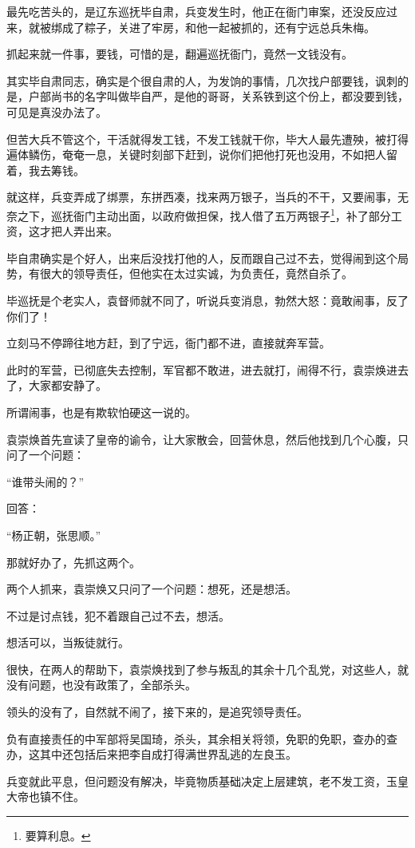 \begin{multicols}{\theparacolNo}
		最先吃苦头的，是辽东巡抚毕自肃，兵变发生时，他正在衙门审案，还没反应过来，就被绑成了粽子，关进了牢房，和他一起被抓的，还有宁远总兵朱梅。

		抓起来就一件事，要钱，可惜的是，翻遍巡抚衙门，竟然一文钱没有。

		其实毕自肃同志，确实是个很自肃的人，为发饷的事情，几次找户部要钱，讽刺的是，户部尚书的名字叫做毕自严，是他的哥哥，关系铁到这个份上，都没要到钱，可见是真没办法了。

		但苦大兵不管这个，干活就得发工钱，不发工钱就干你，毕大人最先遭殃，被打得遍体鳞伤，奄奄一息，关键时刻部下赶到，说你们把他打死也没用，不如把人留着，我去筹钱。

		就这样，兵变弄成了绑票，东拼西凑，找来两万银子，当兵的不干，又要闹事，无奈之下，巡抚衙门主动出面，以政府做担保，找人借了五万两银子\footnote{要算利息。}，补了部分工资，这才把人弄出来。

		毕自肃确实是个好人，出来后没找打他的人，反而跟自己过不去，觉得闹到这个局势，有很大的领导责任，但他实在太过实诚，为负责任，竟然自杀了。

		毕巡抚是个老实人，袁督师就不同了，听说兵变消息，勃然大怒：竟敢闹事，反了你们了！

		立刻马不停蹄往地方赶，到了宁远，衙门都不进，直接就奔军营。

		此时的军营，已彻底失去控制，军官都不敢进，进去就打，闹得不行，袁崇焕进去了，大家都安静了。

		所谓闹事，也是有欺软怕硬这一说的。

		袁崇焕首先宣读了皇帝的谕令，让大家散会，回营休息，然后他找到几个心腹，只问了一个问题：

		“谁带头闹的？”

		回答：

		“杨正朝，张思顺。”

		那就好办了，先抓这两个。

		两个人抓来，袁崇焕又只问了一个问题：想死，还是想活。

		不过是讨点钱，犯不着跟自己过不去，想活。

		想活可以，当叛徒就行。

		很快，在两人的帮助下，袁崇焕找到了参与叛乱的其余十几个乱党，对这些人，就没有问题，也没有政策了，全部杀头。

		领头的没有了，自然就不闹了，接下来的，是追究领导责任。

		负有直接责任的中军部将吴国琦，杀头，其余相关将领，免职的免职，查办的查办，这其中还包括后来把李自成打得满世界乱逃的左良玉。

		兵变就此平息，但问题没有解决，毕竟物质基础决定上层建筑，老不发工资，玉皇大帝也镇不住。


\end{multicols}
